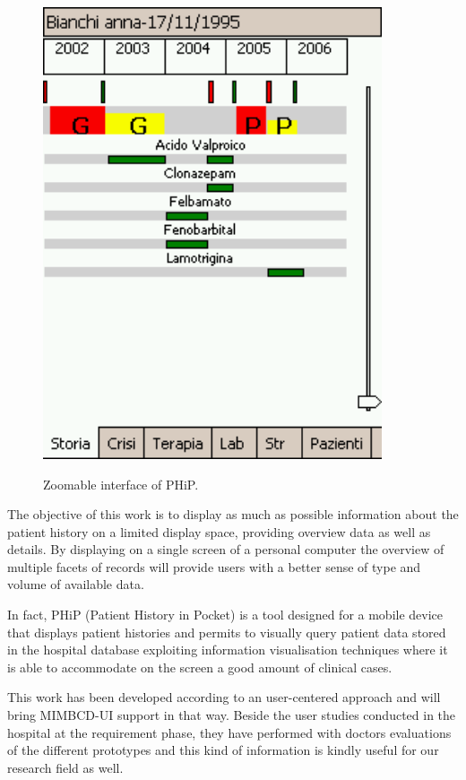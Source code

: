 \begin{figure}[!hbt]
\centering
\includegraphics[width=10cm]{images/zoomable}~\\
\caption{\label{fig:zoomable}Zoomable interface of PHiP.
}
\end{figure}

The objective of this work is to display as much as possible information about the patient history on a limited display space, providing overview data as well as details. By displaying on a single screen of a personal computer the overview of multiple facets of records will provide users with a better sense of type and volume of available data.

In fact, PHiP (Patient History in Pocket) \cite{ardito2006two} is a tool designed for a mobile device that displays patient histories and permits to visually query patient data stored in the hospital database exploiting information visualisation techniques where it is able to accommodate on the screen a good amount of clinical cases.

This work has been developed according to an user-centered approach and will bring MIMBCD-UI support in that way. Beside the user studies conducted in the hospital at the requirement phase, they have performed with doctors evaluations of the different prototypes and this kind of information is kindly useful for our research field as well.

